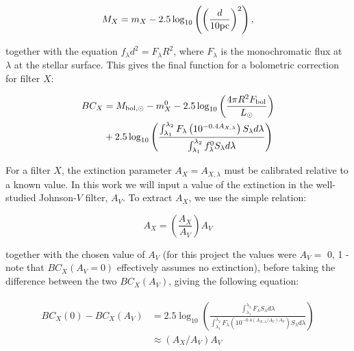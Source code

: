 \documentclass[12pt, a4paper]{report}
\begin{document}
\begin{equation}
M_{X} = m_{X} - 2.5 \log_{10}\left( \left( \frac{d}{10 \textnormal{pc}} \right)^{2} \right),
\label{abs_mag_def}
\end{equation}

together with the equation $f_{\lambda}d^{2}=F_{\lambda}R^{2}$, where $F_{\lambda}$ is the monochromatic flux at $\lambda$ at the stellar surface. This gives the final function for a bolometric correction for filter $X$:

\begin{align}
\begin{split}
BC_{X} &= M_{\textnormal{bol},\odot} - m_{X}^{0} - 2.5 \log_{10} \left( \frac{4\pi R^{2}F_{\textnormal{bol}}}{L_{\odot}} \right) \\
&+ 2.5 \log_{10} \left( \frac{\int_{\lambda_{1}}^{\lambda_{2}} F_{\lambda} \left( 10^{-0.4 A_{X,\lambda}} \right) S_{\lambda} d\lambda}{\int_{\lambda_{1}}^{\lambda_{2}} f_{\lambda}^{0} S_{\lambda} d\lambda} \right)
\label{BC_extinc}
\end{split}
\end{align}

For a filter $X$, the extinction parameter $A_{X} = A_{X,\lambda}$ must be calibrated relative to a known value. In this work we will input a value of the extinction in the well-studied Johnson-$V$ filter, $A_{V}$. To extract $A_{X}$, we use the simple relation:

\begin{equation}
A_{X} = \left( \frac{A_{X}}{A_{V}} \right) A_{V}
\label{ratio_eq}
\end{equation}

together with the chosen value of $A_{V}$ (for this project the values were $A_{V} =$ 0, 1 - note that $BC_{X}(A_{V}=0)$ effectively assumes no extinction), before taking the difference between the two $BC_{X}(A_{V})$, giving the following equation:

\begin{align}
\begin{split}
BC_{X}(0) - BC_{X}(A_{V}) &= 2.5 \log_{10} \left( \frac{\int_{\lambda_{1}}^{\lambda_{2}} F_{\lambda}  S_{\lambda} d\lambda}{\int_{\lambda_{1}}^{\lambda_{2}} F_{\lambda}\left( 10^{-0.4 \left(A_{X,\lambda}/A_{V}\right)A_{V}} \right) S_{\lambda} d\lambda} \right)
\\ &\approx \left(A_{X}/A_{V}\right)A_{V}
\label{BCs_diff}
\end{split}
\end{align}
\end{document}
